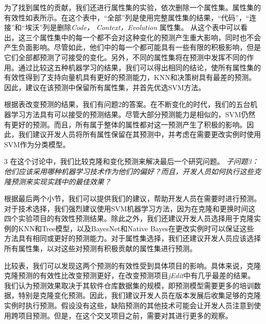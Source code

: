 {为了找到属性的贡献，我们还进行属性集的实验，依次删除一个属性集。属性集的有效性如表所示。在这个表中，“全部”列是使用完整属性集的结果，“代码”，“连接”和“埃沃”列是删除{\em Code， Context，Evolution }属性集。
从这个表中可以看出，这三个属性集中的每一个都不会对这种变化的预测产生重大影响，同时也不会产生负面影响。尽管如此，他们中的每一个都可能具有一些有限的积极影响，但是它们全部都预测了可接受的变化。另外，不同的属性集将在预测中发挥不同的作用。通过比较这五种机器学习的结果，我们可以得出相同的结论，使所有属性集的有效性得到了支持向量机具有更好的预测能力，KNN和决策树具有最差的预测。因此，建议在该预测中保留所有属性集，并首先优选SVM方法。


根据表改变预测的结果，我们有问题2的答案。在不断变化的时代，我们的五台机器学习方法具有可以接受的预测结果。尽管大部分预测能力是相似的，SVM仍然有更好的预测。而且，所有属于整体的属性都对这一预测产生了积极的影响。因此，我们建议开发人员将所有属性保留在其预测中，并考虑在需要更改实例时使用SVM作为分类模型。


{3}
在这个讨论中，我们比较克隆和变化预测来解决最后一个研究问题。
{\em {子问题3：}
他们应该采用哪种机器学习技术作为他们的偏好？而且，开发人员如何执行这些克隆预测来实现实践中的最佳效果？
}

根据最后两个小节，我们可以提供我们的建议，帮助开发人员在需要时进行预测。
对于技术选择，我们强烈建议使用SVM机器学习方法，因为在克隆和更换时间这四个实验项目的有效性预测结果。除此之外，我们还建议开发人员选择用于克隆实例的KNN和Tree模型，以及BayesNet和Native Bayes在更改实例时可以保证这些方法具有相同或更好的预测能力。对于属性集选择，我们还建议开发人员应该选择所有属性集，以对这些对预测有积极贡献的属性集进行预测。%

比较表，我们可以发现这两个预测的有效性受到具体项目的影响。具体来说，克隆克隆预测的有效性比改变预测更好，在改变预测项目{\em jEdit}中有几乎最差的结果。我们认为预测效果取决于其软件仓库数据集的规模，即预测模型需要更多的培训数据，特别是克隆变化预测。因此，我们建议开发人员在版本发展后收集足够的克隆实例时执行预测。假设没有这些，缺陷预测的其他技术可能会让开发人员注意到使用跨项目预测。但是，在这个交叉项目之前，需要对其进行更多的观察。


}
